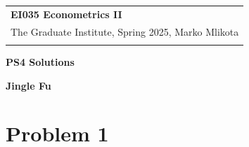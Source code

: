 \documentclass[a4paper,12pt]{article} %
\theoremstyle{nonitalic}
\begin{document}
\thispagestyle{empty} %

\begin{tabular}{p{15.5cm}} %
{\large \bf EI035 Econometrics II} \\
The Graduate Institute, Spring 2025, Marko Mlikota\\
\hline %
\\
\end{tabular} %

\vspace*{0.3cm} %

\begin{center} %
	{\Large \bf PS4 Solutions} %
	\vspace{2mm}
	
	{\bf Jingle Fu} %
		
\end{center}  

\vspace{0.4cm}

\section{Problem 1}
\end{document}
